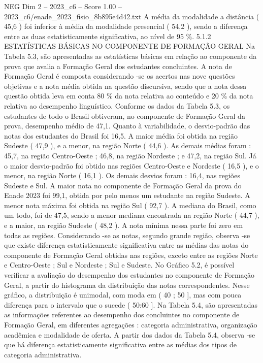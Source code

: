 \begin{textsample}{NEG Dim 2 – 2023\_c6 – Score 1.00 – 2023\_c6/enade\_2023\_fisio\_8b895e4d42.txt}
A média da modalidade a distância ( 45,6 ) foi inferior à média da modalidade presencial ( 54,2 ), sendo a diferença entre as duas estatisticamente significativa, ao nível de 95 \%. 5.1.2 ESTATÍSTICAS BÁSICAS NO COMPONENTE DE FORMAÇÃO GERAL Na Tabela 5.3, são apresentadas as estatísticas básicas em relação ao componente da prova que avalia a Formação Geral dos estudantes concluintes.
A nota de Formação Geral é composta considerando -se os acertos nas nove questões objetivas e a nota média obtida na questão discursiva, sendo que a nota dessa questão obtida leva em conta 80 \% da nota relativa ao conteúdo e 20 \% da nota relativa ao desempenho linguístico.
Conforme os dados da Tabela 5.3, os estudantes de todo o Brasil obtiveram, no componente de Formação Geral da prova, desempenho médio de 47,1.
Quanto à variabilidade, o desvio-padrão das notas dos estudantes do Brasil foi 16,5.
A maior média foi obtida na região Sudeste ( 47,9 ), e a menor, na região Norte ( 44,6 ).
As demais médias foram : 45,7, na região Centro-Oeste ; 46,8, na região Nordeste ; e 47,2, na região Sul.
Já o maior desvio-padrão foi obtido nas regiões Centro-Oeste e Nordeste ( 16,5 ), e o menor, na região Norte ( 16,1 ).
Os demais desvios foram : 16,4, nas regiões Sudeste e Sul.
A maior nota no componente de Formação Geral da prova do Enade 2023 foi 99,1, obtida por pelo menos um estudante na região Sudeste.
A menor nota máxima foi obtida na região Sul ( 92,7 ).
A mediana do Brasil, como um todo, foi de 47,5, sendo a menor mediana encontrada na região Norte ( 44,7 ), e a maior, na região Sudeste ( 48,2 ).
A nota mínima nessa parte foi zero em todas as regiões.
Considerando -se as notas, segundo grande região, observa -se que existe diferença estatisticamente significativa entre as médias das notas do componente de Formação Geral obtidas nas regiões, exceto entre as regiões Norte e Centro-Oeste ; Sul e Nordeste ; Sul e Sudeste.
No Gráfico 5.2, é possível verificar a avaliação do desempenho dos estudantes no componente de Formação Geral, a partir do histograma da distribuição das notas correspondentes.
Nesse gráfico, a distribuição é unimodal, com moda em ( 40 ; 50 ], mas com pouca diferença para o intervalo que o sucede ( 50:60 ].
Na Tabela 5.4, são apresentadas as informações referentes ao desempenho dos concluintes no componente de Formação Geral, em diferentes agregações : categoria administrativa, organização acadêmica e modalidade de oferta.
A partir dos dados da Tabela 5.4, observa -se que há diferença estatisticamente significativa entre as médias dos tipos de categoria administrativa.

\end{textsample}
